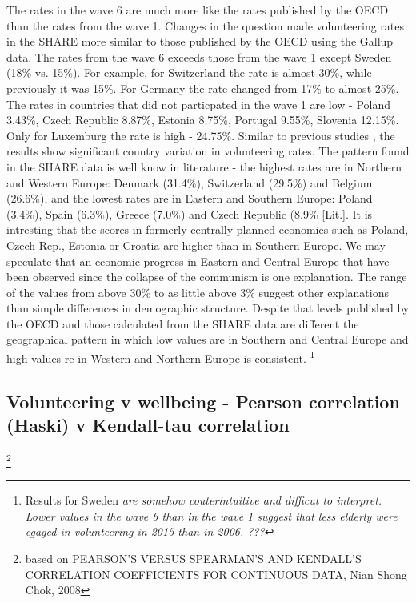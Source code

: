 \documentclass[10pt, letterpaper]{article}
\begin{document}
\begin{spacing}{1.4}
The rates in the wave 6 are much more like the rates published by the OECD than the rates from the wave 1. Changes in the question made volunteering rates in the SHARE more similar to those published by the OECD using the Gallup data. The rates from the wave 6 exceeds those from the wave 1 except Sweden (18\% vs. 15\%).  For example, for Switzerland the rate is almost 30\%, while previously it was 15\%. For Germany the rate changed from 17\% to almost 25\%. The rates in countries that did not particpated in the wave 1 are low - Poland 3.43\%, Czech Republic 8.87\%, Estonia 8.75\%, Portugal 9.55\%, Slovenia 12.15\%. Only for Luxemburg the rate is high - 24.75\%. Similar to previous studies , the results show significant country variation in volunteering rates. The pattern found in the SHARE data is well know in literature - the highest rates are in Northern and Western Europe:  Denmark (31.4\%), Switzerland (29.5\%) and Belgium (26.6\%), and the lowest rates are in Eastern and Southern Europe: Poland (3.4\%), Spain (6.3\%), Greece (7.0\%) and Czech Republic (8.9\% [Lit.]. It is intresting that the scores in formerly centrally-planned economies such as Poland, Czech Rep., Estonia or Croatia are higher than in Southern Europe. We may speculate that an economic progress in Eastern and Central Europe that have been observed since the collapse of the communism is  one explanation. The range of the values from above 30\% to as little above 3\% suggest other explanations than simple differences in demographic structure.   Despite that levels published by the OECD and those calculated from the SHARE data are different the geographical pattern in which low values are in Southern and Central Europe and high values re in  Western and Northern Europe is consistent. \footnote{Results for Sweden \textit{are somehow couterintuitive and difficut to interpret. Lower values in the wave 6 than in the wave 1 suggest that less elderly were egaged in volunteering in 2015 than in 2006. ??? }} \\



\subsection*{Volunteering v wellbeing - Pearson correlation (Haski) v Kendall-tau correlation}

\footnote{based on PEARSON'S VERSUS SPEARMAN'S AND KENDALL'S CORRELATION COEFFICIENTS FOR CONTINUOUS DATA, Nian Shong Chok, 2008}




\end{spacing}
\end{document}
